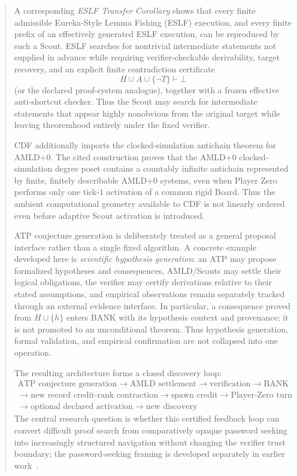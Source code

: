 \documentclass[11pt]{article}
\theoremstyle{definition}
\newcommand{\BANK}{\mathrm{BANK}}
\begin{document}
\begin{abstract}
A corresponding \emph{ESLF Transfer Corollary} shows that every finite admissible Eureka-Style Lemma Fishing (ESLF) execution, and every finite prefix of an effectively generated ESLF execution, can be reproduced by such a Scout. ESLF searches for nontrivial intermediate statements not supplied in advance while requiring verifier-checkable derivability, target recovery, and an explicit finite contradiction certificate
\[
H\cup A\cup\{\neg T\}\vdash\bot
\]
(or the declared proof-system analogue), together with a frozen effective anti-shortcut checker. Thus the Scout may search for intermediate statements that appear highly nonobvious from the original target while leaving theoremhood entirely under the fixed verifier.

CDF additionally imports the clocked-simulation antichain theorem for AMLD+0. The cited construction proves that the AMLD+0 clocked-simulation degree poset contains a countably infinite antichain represented by finite, finitely describable AMLD+0 systems, even when Player Zero performs only one tick-$1$ activation of a common rigid Board. Thus the ambient computational geometry available to CDF is not linearly ordered even before adaptive Scout activation is introduced.

ATP conjecture generation is deliberately treated as a general proposal interface rather than a single fixed algorithm. A concrete example developed here is \emph{scientific hypothesis generation}: an ATP may propose formalized hypotheses and consequences, AMLD/Scouts may settle their logical obligations, the verifier may certify derivations relative to their stated assumptions, and empirical observations remain separately tracked through an external evidence interface. In particular, a consequence proved from $H\cup\{h\}$ enters BANK with its hypothesis context and provenance; it is not promoted to an unconditional theorem. Thus hypothesis generation, formal validation, and empirical confirmation are not collapsed into one operation.

The resulting architecture forms a closed discovery loop:
\[
\boxed{\begin{gathered}
\text{ATP conjecture generation}\to\text{AMLD settlement}\to\text{verification}\to\BANK\\
\to\text{new record credit-rank contraction}\to\text{spawn credit}\to\text{Player-Zero turn}\\
\to\text{optional declared activation}\to\text{new discovery}
\end{gathered}}
\]
The central research question is whether this certified feedback loop can convert difficult proof search from comparatively opaque password seeking into increasingly structured navigation without changing the verifier trust boundary; the password-seeking framing is developed separately in earlier work~\cite{tenneson-password}.
\end{abstract}
\end{document}
